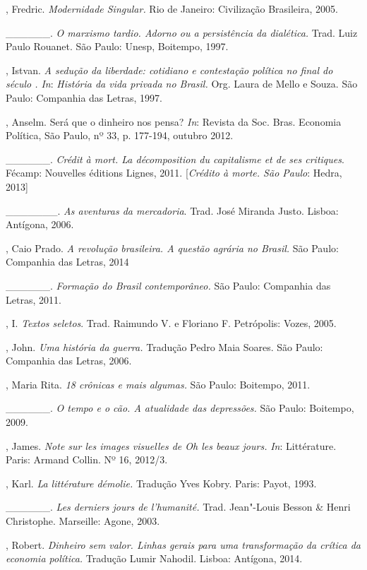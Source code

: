 \begin{Parskip}
, Fredric. \emph{Modernidade Singular.} Rio de Janeiro:
Civilização Brasileira, 2005.

\_\_\_\_\_\_. \emph{O marxismo tardio. Adorno ou a persistência da
dialética.} Trad. Luiz Paulo Rouanet. São Paulo: Unesp, Boitempo, 1997.

, Istvan. \emph{A sedução da liberdade: cotidiano e contestação
política no final do século . In}: \emph{História da vida privada
no Brasil.} Org. Laura de Mello e Souza. São Paulo: Companhia das Letras, 1997.

, Anselm. Será que o dinheiro nos pensa? \emph{In}: Revista da Soc. Bras.
Economia Política, São Paulo, nº 33, p. 177-194, outubro 2012.

\_\_\_\_\_\_. \emph{Crédit à mort. La décomposition du capitalisme et
de ses critiques}. Fécamp: Nouvelles éditions Lignes, 2011. [\emph{Crédito
à morte. São Paulo}: Hedra, 2013]

\_\_\_\_\_\_\_. \emph{As aventuras da mercadoria}. Trad. José
Miranda Justo. Lisboa: Antígona, 2006.

, Caio Prado. \emph{A revolução brasileira. A questão agrária no
Brasil.} São Paulo: Companhia das Letras, 2014

\_\_\_\_\_\_. \emph{Formação do Brasil contemporâneo.} São Paulo: Companhia das Letras, 2011.

, I. \emph{Textos seletos}. Trad. Raimundo V. e Floriano F.
Petrópolis: Vozes, 2005.

, John. \emph{Uma história da guerra.} Tradução Pedro Maia
Soares. São Paulo: Companhia das Letras, 2006.

, Maria Rita. \emph{18 crônicas e mais algumas.} São Paulo:
Boitempo, 2011.

\_\_\_\_\_\_. \emph{O tempo e o cão. A atualidade das depressões.} São
Paulo: Boitempo, 2009.

, James. \emph{Note sur les images visuelles de \emph{Oh les
beaux jours}.} \emph{In}: Littérature. Paris: Armand Collin. Nº 16, 2012/3.

, Karl. \emph{La littérature démolie.} Tradução Yves Kobry.
Paris: Payot, 1993.

\_\_\_\_\_\_. \emph{Les derniers jours de l'humanité.} Trad. Jean"-Louis
Besson \& Henri Christophe. Marseille: Agone, 2003.

, Robert. \emph{Dinheiro sem valor. Linhas gerais para uma
transformação da crítica da economia política.} Tradução Lumir Nahodil.
Lisboa: Antígona, 2014.


\end{Parskip}

